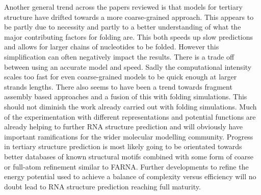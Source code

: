 \documentclass[journal]{IEEEtran}
\begin{document}
Another general trend across the papers reviewed is that models for tertiary structure have drifted towards a more coarse-grained approach. This appears to be partly due to necessity and partly to a better understanding of what the major contributing factors for folding are. This both speeds up slow predictions and allows for larger chains of nucleotides to be folded. However this simplification can often negatively impact the results. There is a trade off between using an accurate model and speed. Sadly the computational intensity scales too fast for even coarse-grained models to be quick enough at larger strands lengths. There also seems to have been a trend towards fragment assembly based approaches and a fusion of this with folding simulations. This should not diminish the work already carried out with folding simulations. Much of the experimentation with different representations and potential functions are already helping to further RNA structure prediction and will obviously have important ramifications for the wider molecular modelling community. Progress in tertiary structure prediction is most likely going to be orientated towards better databases of known structural motifs combined with some form of coarse or full-atom refinement similar to FARNA. Further developments to refine the energy potential used to achieve a balance of complexity versus efficiency will no doubt lead to RNA structure prediction reaching full maturity.



%
\end{document}

